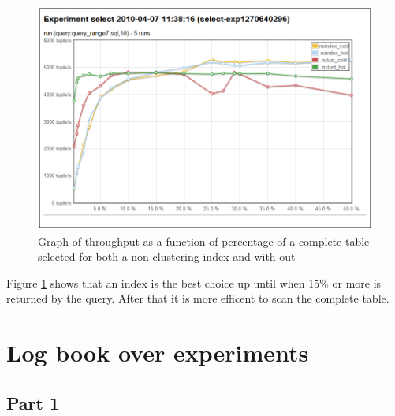 \begin{figure}
  \centering
  \includegraphics[width=12cm]{assignment2/select}
  \caption[Read performance - Index vs. Scan]{Graph of throughput as a function
  of percentage of a complete table selected for both a non-clustering index and
  with out}\label{fig:select}
\end{figure}

Figure \ref{fig:select} shows that an index is the best choice up until when
15\% or more is returned by the query. After that it is more efficent to scan
the complete table.


\chapter{Log book over experiments}

\section{Part 1}

